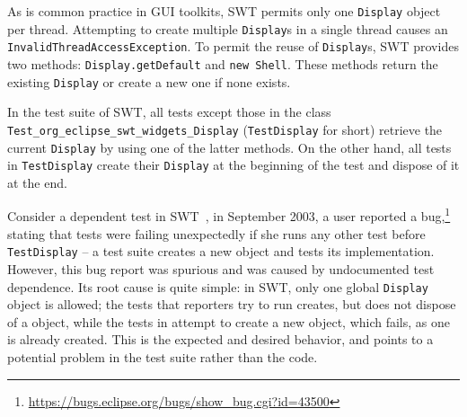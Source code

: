 \newcommand{\ite}{\texttt{Invalid\-Thread\-Access\-Exception}}

%

As is common practice in GUI toolkits, SWT permits only one
\texttt{Display} object per thread. Attempting to create multiple
\texttt{Display}s in a single thread causes an \ite{}. 
To permit the reuse of \texttt{Display}s, SWT provides two 
methods: \texttt{Display.getDefault} and \texttt{new Shell}. These
methods return the existing \texttt{Display} or create a new one if none exists.


In the test suite of SWT, all tests except those in the class \texttt{Test\_org\_eclipse\_swt\_widgets\_Display}
(\texttt{TestDisplay} for short) retrieve the current \texttt{Display} by using
one of the latter methods. On the other hand, all tests in
\texttt{TestDisplay} create their \texttt{Display} at the beginning of the test
and dispose of it at the end. 



Consider a dependent test in SWT~\cite{swt},
in September 2003, a user reported a
bug,\footnote{\url{https://bugs.eclipse.org/bugs/show_bug.cgi?id=43500}}
stating that tests were failing unexpectedly
if she runs any other test before \texttt{TestDisplay} --
a test suite creates a new  object and tests its
implementation. However, this bug report was spurious and was
caused by undocumented test dependence.
Its root cause is quite simple: in SWT, only one global \texttt{Display}
object is allowed; the tests that reporters try to run
creates, but does not dispose of a  object, while
the tests in  attempt to create
a new  object, which fails, as one
is already created. This is the expected and desired behavior,
and points to a potential problem in the test suite rather
than the code.


